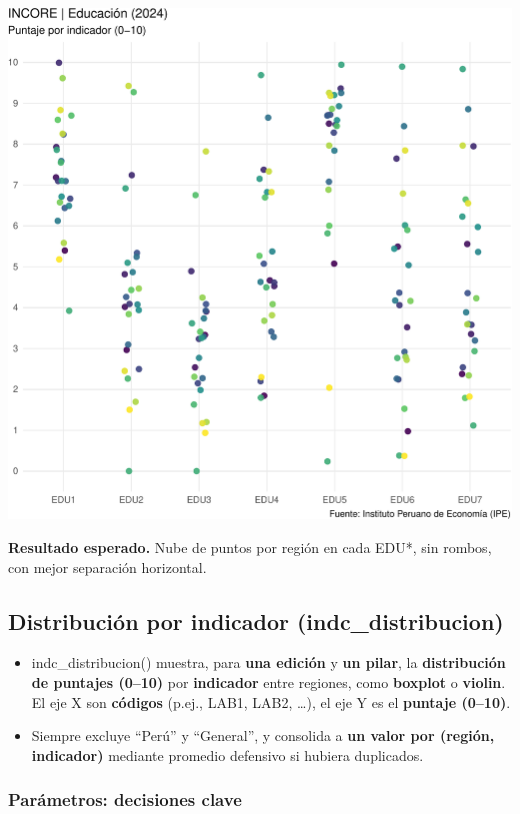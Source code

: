 \documentclass[
  11pt,
  letterpaper,
  DIV=11,
  numbers=noendperiod]{scrartcl}
\begin{document}
\includegraphics{Manual_files/figure-pdf/unnamed-chunk-90-1.pdf}

\textbf{Resultado esperado.} Nube de puntos por región en cada EDU*, sin
rombos, con mejor separación horizontal.

\subsection{\texorpdfstring{\textbf{Distribución por indicador
(indc\_distribucion)}}{Distribución por indicador (indc\_distribucion)}}\label{distribuciuxf3n-por-indicador-indc_distribucion}

\begin{itemize}
\item
  indc\_distribucion() muestra, para \textbf{una edición} y \textbf{un
  pilar}, la \textbf{distribución de puntajes (0--10)} por
  \textbf{indicador} entre regiones, como \textbf{boxplot} o
  \textbf{violin}. El eje X son \textbf{códigos} (p.ej., LAB1, LAB2,
  \ldots), el eje Y es el \textbf{puntaje (0--10)}.
\item
  Siempre excluye ``Perú'' y ``General'', y consolida a \textbf{un valor
  por (región, indicador)} mediante promedio defensivo si hubiera
  duplicados.
\end{itemize}

\subsubsection{\texorpdfstring{\textbf{Parámetros: decisiones
clave}}{Parámetros: decisiones clave}}\label{paruxe1metros-decisiones-clave-3}
\end{document}
